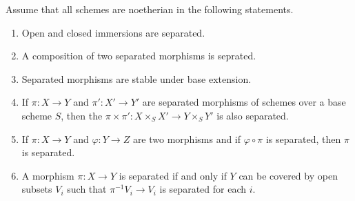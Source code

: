 \begin{corollary}[Hartshorne, II.4.6]
    Assume that all schemes are noetherian in the following statements.
    \begin{enumerate}[label=(\alph*)]
        \item Open and closed immersions are separated.
        \item A composition of two separated morphisms is seprated. 
        \item Separated morphisms are stable under base extension.
        \item If $\pi: X\to Y$ and $\pi': X'\to Y'$ are separated morphisms of schemes over a base scheme $S$, then the  $\pi\times\pi': X\times_S X'\to Y\times_S Y'$ is also separated.
        \item If $\pi: X\to Y$ and $\varphi: Y\to Z$ are two morphisms and if $\varphi\circ\pi$ is separated, then $\pi$ is separated.
        \item A morphism $\pi: X\to Y$ is separated if and only if $Y$ can be covered by open subsets $V_i$ such that $\pi^{-1}V_i\to V_i$ is separated for each $i$.
    \end{enumerate}
\end{corollary}
